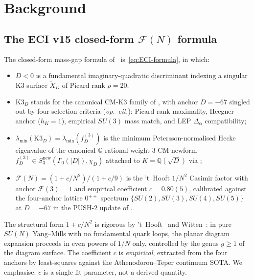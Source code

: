 \documentclass[11pt,a4paper]{amsart}
\theoremstyle{definition}
\begin{document}
\section{Background}\label{sec:background}

\subsection{The ECI v15 closed-form $\mathcal{F}(N)$ formula}

The closed-form mass-gap formula of~\cite[Theorem~C.1]{ThmC6FN} is~\eqref{eq:ECI-formula},
in which:
\begin{itemize}\setlength\itemsep{2pt}
\item $D < 0$ is a fundamental imaginary-quadratic discriminant indexing a singular K3
      surface $\widetilde X_{D}$ of Picard rank $\rho = 20$;
\item $\mathrm{K3}_{D}$ stands for the canonical CM-$\mathrm{K3}$ family of
      \cite[\S1.2]{E08Maxwell}, with anchor $D = -67$ singled out by four selection
      criteria (\emph{op.~cit.}): Picard rank maximality, Heegner anchor
      ($h_{K} = 1$), empirical $SU(3)$ mass match, and LEP $\Delta_{\alpha}$
      compatibility;
\item $\lambda_{\min}(\mathrm{K3}_{D}) = \lambda_{\min}(f_{D}^{(3)})$ is the minimum
      Petersson-normalised Hecke eigenvalue of the canonical $\mathbb{Q}$-rational
      weight-$3$ CM newform $f_{D}^{(3)} \in S_{3}^{\mathrm{new}}(\Gamma_{0}(|D|), \chi_{D})$
      attached to $K = \mathbb{Q}(\sqrt{D})$ via \cite[Theorem~4]{Shimura1971};
\item $\mathcal{F}(N) = (1 + c/N^{2})/(1 + c/9)$ is the 't~Hooft $1/N^{2}$ Casimir
      factor with anchor $\mathcal{F}(3) = 1$ and empirical coefficient
      $c = 0.80(5)$, calibrated against the four-anchor lattice $0^{++}$ spectrum
      $\{SU(2), SU(3), SU(4), SU(5)\}$ at $D = -67$ in the PUSH-2 update of
      \cite[\S6.3]{ThmC6FN}.
\end{itemize}
The structural form $1 + c/N^{2}$ is rigorous by 't~Hooft~\cite{tHooft1974} and
Witten~\cite{Witten1979}: in pure $SU(N)$ Yang--Mills with no fundamental quark
loops, the planar diagram expansion proceeds in even powers of $1/N$ only,
controlled by the genus $g \ge 1$ of the diagram surface. The coefficient $c$ is
\emph{empirical}, extracted from the four anchors by least-squares against
the Athenodorou--Teper continuum SOTA. We emphasise: $c$ is a single fit
parameter, not a derived quantity.
\end{document}
